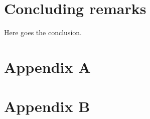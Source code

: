 \documentclass{Trade_template}
\numberwithin{equation}{section}
\begin{document}
\chapter{Concluding remarks} \label{Concluding remarks}

Here goes the conclusion.

\newpage

\nocite{*}


\newpage

\chapter*{Appendix A} \label{Appendix A}



\chapter*{Appendix B} \label{Appendix B}



\newpage
\end{document}
